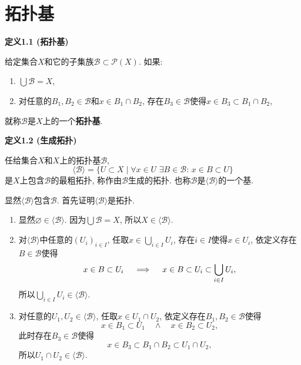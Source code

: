 \documentclass[UTF8]{ctexart}
\begin{document}
\setlength{\abovedisplayskip}{1pt}
\setlength{\belowdisplayskip}{1pt}

\section{拓扑基}

\hypertarget{sec:定义1.1}{}
\noindent\textbf{定义1.1 (拓扑基)}

给定集合$X$和它的子集族$\mathcal{B}\subset\mathcal{P}(X)$. 如果:
\vspace{3pt}
\begin{enumerate}
    \item $\displaystyle\bigcup\mathcal{B}=X$,
    \vspace{3pt}
    \item 对任意的$B_1,B_2\in\mathcal{B}$和$x\in B_1\cap B_2$,
    存在$B_3\in\mathcal{B}$使得$x\in B_3\subset B_1\cap B_2$,
\end{enumerate}
就称$\mathcal{B}$是$X$上的一个\textbf{拓扑基}.

\vspace{10pt}

\hypertarget{sec:定义1.2}{}
\noindent\textbf{定义1.2 (生成拓扑)}

任给集合$X$和$X$上的拓扑基$\mathcal{B}$,
\[
    \langle\mathcal{B}\rangle=\{U\subset X\mid
    \forall x\in U\,\,\exists B\in\mathcal{B}:\,x\in B\subset U\}
\]
是$X$上包含$\mathcal{B}$的最粗拓扑, 称作由$\mathcal{B}$生成的拓扑.
也称$\mathcal{B}$是$\langle\mathcal{B}\rangle$的一个基.


显然$\langle\mathcal{B}\rangle$包含$\mathcal{B}$.
首先证明$\langle\mathcal{B}\rangle$是拓扑.

\begin{enumerate}
    \item 显然$\varnothing\in\langle\mathcal{B}\rangle$.
    因为$\displaystyle\bigcup\mathcal{B}=X$, 所以$X\in\langle\mathcal{B}\rangle$.
    \vspace{3pt}
    \item 对$\langle\mathcal{B}\rangle$中任意的$(U_i)_{i\in I}$,
    任取$\displaystyle x\in\bigcup_{i\in I}U_i$, 存在$i\in I$使得$x\in U_i$,
    依定义存在$B\in\mathcal{B}$使得
    \vspace{3pt}
    \[
        x\in B\subset U_i\quad\implies\quad
        x\in B\subset U_i\subset\bigcup_{i\in I}U_i,\\[-3pt]
    \]
    所以$\displaystyle\bigcup_{i\in I}U_i\in\langle\mathcal{B}\rangle$.
    \vspace{3pt}
    \item 对任意的$U_1,U_2\in\langle\mathcal{B}\rangle$, 任取$x\in U_1\cap U_2$,
    依定义存在$B_1,B_2\in\mathcal{B}$使得
    \[
        x\in B_1\subset U_1\quad\land\quad x\in B_2\subset U_2,
    \]
    此时存在$B_3\in\mathcal{B}$使得
    \[
        x\in B_3\subset B_1\cap B_2\subset U_1\cap U_2,
    \]
    所以$U_1\cap U_2\in\langle\mathcal{B}\rangle$.
\end{enumerate}
\end{document}
